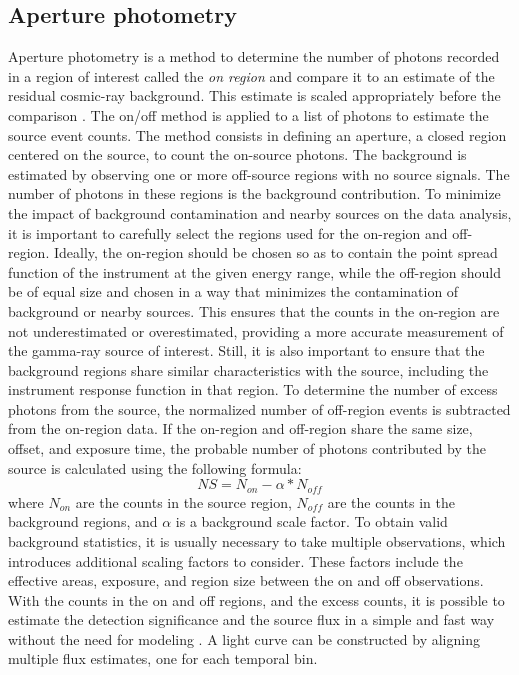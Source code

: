 \subsection{Aperture photometry}
\label{ss:aperture-photometry}
Aperture photometry is a method to determine the number of photons recorded in a region of interest called the \textit{on region} and compare it to an estimate of the residual cosmic-ray background. This estimate is scaled appropriately before the comparison \cite{mohrmann2019}. The on/off method is applied to a list of photons to estimate the source event counts. The method consists in defining an aperture, a closed region centered on the source, to count the on-source photons. The background is estimated by observing one or more off-source regions with no source signals. The number of photons in these regions is the background contribution. To minimize the impact of background contamination and nearby sources on the data analysis, it is important to carefully select the regions used for the on-region and off-region. Ideally, the on-region should be chosen so as to contain the point spread function of the instrument at the given energy range, while the off-region should be of equal size and chosen in a way that minimizes the contamination of background or nearby sources. This ensures that the counts in the on-region are not underestimated or overestimated, providing a more accurate measurement of the gamma-ray source of interest. Still, it is also important to ensure that the background regions share similar characteristics with the source, including the instrument response function in that region. To determine the number of excess photons from the source, the normalized number of off-region events is subtracted from the on-region data. If the on-region and off-region share the same size, offset, and exposure time, the probable number of photons contributed by the source is calculated using the following formula:
\begin{equation}
NS = N_{on} - \alpha*N_{off}
\end{equation}
where $N_{on}$ are the counts in the source region, $N_{off}$ are the counts in the background regions, and $\alpha$ is a background scale factor.
To obtain valid background statistics, it is usually necessary to take multiple observations, which introduces additional scaling factors to consider. These factors include the effective areas, exposure, and region size between the on and off observations. With the counts in the on and off regions, and the excess counts, it is possible to estimate the detection significance and the source flux in a simple and fast way without the need for modeling \cite{tampieri2020real}. A light curve can be constructed by aligning multiple flux estimates, one for each temporal bin.

